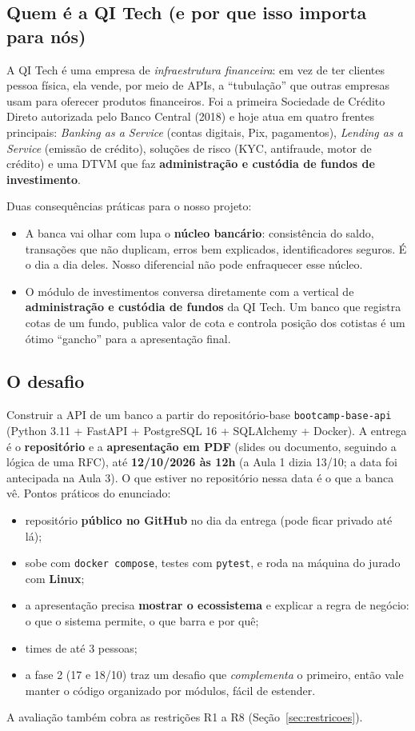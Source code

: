 \documentclass[11pt,a4paper]{article}
\newcommand{\tb}[1]{\texttt{#1}}           %
\begin{document}
\subsection{Quem é a QI Tech (e por que isso importa para nós)}

A QI Tech é uma empresa de \emph{infraestrutura financeira}: em vez de ter clientes pessoa
física, ela vende, por meio de APIs, a ``tubulação'' que outras empresas usam para oferecer
produtos financeiros. Foi a primeira Sociedade de Crédito Direto autorizada pelo Banco
Central (2018) e hoje atua em quatro frentes principais: \emph{Banking as a Service}
(contas digitais, Pix, pagamentos), \emph{Lending as a Service} (emissão de crédito),
soluções de risco (KYC, antifraude, motor de crédito) e uma DTVM que faz
\textbf{administração e custódia de fundos de investimento}.

Duas consequências práticas para o nosso projeto:

\begin{itemize}
  \item A banca vai olhar com lupa o \textbf{núcleo bancário}: consistência do saldo,
        transações que não duplicam, erros bem explicados, identificadores seguros. É o
        dia a dia deles. Nosso diferencial não pode enfraquecer esse núcleo.
  \item O módulo de investimentos conversa diretamente com a vertical de
        \textbf{administração e custódia de fundos} da QI Tech. Um banco que registra cotas
        de um fundo, publica valor de cota e controla posição dos cotistas é um ótimo
        ``gancho'' para a apresentação final.
\end{itemize}

\subsection{O desafio}

Construir a API de um banco a partir do repositório-base \tb{bootcamp-base-api}
(Python 3.11 + FastAPI + PostgreSQL 16 + SQLAlchemy + Docker). A entrega é o
\textbf{repositório} e a \textbf{apresentação em PDF} (slides ou documento, seguindo a lógica de
uma RFC), até \textbf{12/10/2026 às 12h} (a Aula 1 dizia 13/10; a data foi antecipada na Aula 3).
O que estiver no repositório nessa data é o que a banca vê. Pontos práticos do enunciado:
\begin{itemize}
  \item repositório \textbf{público no GitHub} no dia da entrega (pode ficar privado até lá);
  \item sobe com \tb{docker compose}, testes com \tb{pytest}, e roda na máquina do jurado com
        \textbf{Linux};
  \item a apresentação precisa \textbf{mostrar o ecossistema} e explicar a regra de negócio: o
        que o sistema permite, o que barra e por quê;
  \item times de até 3 pessoas;
  \item a fase 2 (17 e 18/10) traz um desafio que \emph{complementa} o primeiro, então vale manter o
        código organizado por módulos, fácil de estender.
\end{itemize}
A avaliação também cobra as restrições R1 a R8 (Seção~\ref{sec:restricoes}).
\end{document}
